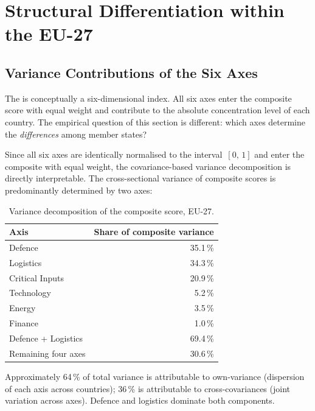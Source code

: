 \newpage
\section{Structural Differentiation within the EU-27}
\label{sec:differentiation}

\subsection{Variance Contributions of the Six Axes}

The \ISI is conceptually a six-dimensional index.  All six axes
enter the composite score with equal weight and contribute to the
absolute concentration level of each country.  The empirical
question of this section is different: which axes determine the
\emph{differences} among member states?

Since all six axes are identically normalised to the
interval~$[0,\,1]$ and enter the composite with equal weight, the
covariance-based variance decomposition is directly interpretable.
The cross-sectional variance of composite scores is predominantly
determined by two axes:

\begin{table}[htbp]
\centering\small
\caption{Variance decomposition of the \ISI composite score, EU-27.}
\label{tab:variance}
\begin{tabular}{@{}lr@{}}
\toprule
\textbf{Axis} & \textbf{Share of composite variance} \\
\midrule
Defence            & 35.1\,\% \\
Logistics          & 34.3\,\% \\
Critical Inputs    & 20.9\,\% \\
Technology         &  5.2\,\% \\
Energy             &  3.5\,\% \\
Finance            &  1.0\,\% \\
\midrule
Defence + Logistics      & 69.4\,\% \\
Remaining four axes      & 30.6\,\% \\
\bottomrule
\end{tabular}
\end{table}

Approximately 64\,\% of total variance is attributable to
own-variance (dispersion of each axis across countries); 36\,\%
is attributable to cross-covariances (joint variation across
axes).  Defence and logistics dominate both components.

